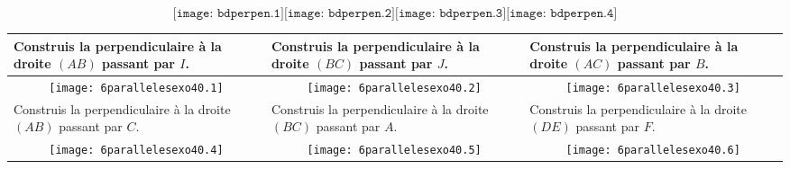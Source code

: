 \[\texttt{[image: bdperpen.1]}\texttt{[image: bdperpen.2]}\texttt{[image: bdperpen.3]}\texttt{[image: bdperpen.4]}\]
\begin{center}
  \begin{tabularx}{\linewidth}{|X|X|X|}
    \hline
    Construis la perpendiculaire à la droite $(AB)$ passant par
    $I$.&Construis la perpendiculaire à la droite $(BC)$ passant par
    $J$.&Construis la perpendiculaire à la droite $(AC)$ passant par $B$.\\
    \hline
    \multicolumn{1}{|c|}{\texttt{[image: 6parallelesexo40.1]}}&\multicolumn{1}{c|}{\texttt{[image: 6parallelesexo40.2]}}&\multicolumn{1}{c|}{\texttt{[image: 6parallelesexo40.3]}}\\
    \hline
    Construis la perpendiculaire à la droite $(AB)$ passant par
    $C$.&Construis la perpendiculaire à la droite $(BC)$ passant par
    $A$.&Construis la perpendiculaire à la droite $(DE)$ passant par $F$.\\
    \hline
    \multicolumn{1}{|c|}{\texttt{[image: 6parallelesexo40.4]}}&\multicolumn{1}{c|}{\texttt{[image: 6parallelesexo40.5]}}&\multicolumn{1}{c|}{\texttt{[image: 6parallelesexo40.6]}}\\
    \hline
  \end{tabularx}
\end{center}
